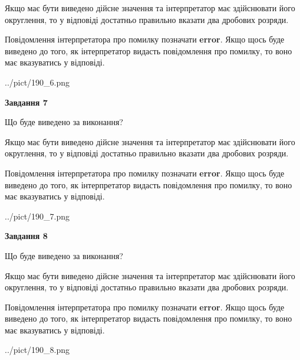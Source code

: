\documentclass[12pt, ukrainian]{article}
\begin{document}
{\begin {Large}
Якщо має бути виведено дійсне значення та інтерпретатор має здійснювати його округлення, 
то у відповіді достатньо правильно вказати два дробових розряди.

Повідомлення інтерпретатора про помилку позначати \textbf{error}.
Якщо щось буде виведено до того, як інтерпретатор видасть повідомлення про помилку, 
то воно має вказуватись у відповіді. \par

\begin{center}
	{../pict/190_6.png}
\end{center}
\newpage

{\begin {center}\textbf{Завдання 7}\end {center}}\par
Що буде виведено за виконання? \par

Якщо має бути виведено дійсне значення та інтерпретатор має здійснювати його округлення, 
то у відповіді достатньо правильно вказати два дробових розряди.

Повідомлення інтерпретатора про помилку позначати \textbf{error}.
Якщо щось буде виведено до того, як інтерпретатор видасть повідомлення про помилку, 
то воно має вказуватись у відповіді. \par

\begin{center}
	{../pict/190_7.png}
\end{center}
\newpage

{\begin {center}\textbf{Завдання 8}\end {center}}\par
Що буде виведено за виконання? \par

Якщо має бути виведено дійсне значення та інтерпретатор має здійснювати його округлення, 
то у відповіді достатньо правильно вказати два дробових розряди.

Повідомлення інтерпретатора про помилку позначати \textbf{error}.
Якщо щось буде виведено до того, як інтерпретатор видасть повідомлення про помилку, 
то воно має вказуватись у відповіді. \par

\begin{center}
	{../pict/190_8.png}
\end{center}
\newpage


\end{Large}}
\end{document}

